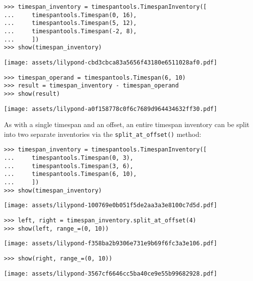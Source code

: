 \begin{singlespacing}
\vspace{-0.5\baselineskip}
\begin{lstlisting}
>>> timespan_inventory = timespantools.TimespanInventory([
...     timespantools.Timespan(0, 16),
...     timespantools.Timespan(5, 12),
...     timespantools.Timespan(-2, 8),
...     ])
>>> show(timespan_inventory)
\end{lstlisting}
\noindent\texttt{[image: assets/lilypond-cbd3cbca83a5656f43180e6511028af0.pdf]}
\begin{lstlisting}
>>> timespan_operand = timespantools.Timespan(6, 10)
>>> result = timespan_inventory - timespan_operand
>>> show(result)
\end{lstlisting}
\noindent\texttt{[image: assets/lilypond-a0f158778c0f6c7689d964434632ff30.pdf]}
\end{singlespacing}

\noindent As with a single timespan and an offset, an entire timespan inventory
can be split into two separate inventories via the \texttt{split\_at\_offset()}
method:

\begin{comment}
<abjad>
timespan_inventory = timespantools.TimespanInventory([
    timespantools.Timespan(0, 3),
    timespantools.Timespan(3, 6),
    timespantools.Timespan(6, 10),
    ])
show(timespan_inventory)
left, right = timespan_inventory.split_at_offset(4)
show(left, range_=(0, 10))
show(right, range_=(0, 10))
</abjad>
\end{comment}

\begin{singlespacing}
\vspace{-0.5\baselineskip}
\begin{lstlisting}
>>> timespan_inventory = timespantools.TimespanInventory([
...     timespantools.Timespan(0, 3),
...     timespantools.Timespan(3, 6),
...     timespantools.Timespan(6, 10),
...     ])
>>> show(timespan_inventory)
\end{lstlisting}
\noindent\texttt{[image: assets/lilypond-100769e0b051f5de2aa3a3e8100c7d5d.pdf]}
\begin{lstlisting}
>>> left, right = timespan_inventory.split_at_offset(4)
>>> show(left, range_=(0, 10))
\end{lstlisting}
\noindent\texttt{[image: assets/lilypond-f358ba2b9306e731e9b69f6fc3a3e106.pdf]}
\begin{lstlisting}
>>> show(right, range_=(0, 10))
\end{lstlisting}
\noindent\texttt{[image: assets/lilypond-3567cf6646cc5ba40ce9e55b99682928.pdf]}
\end{singlespacing}

